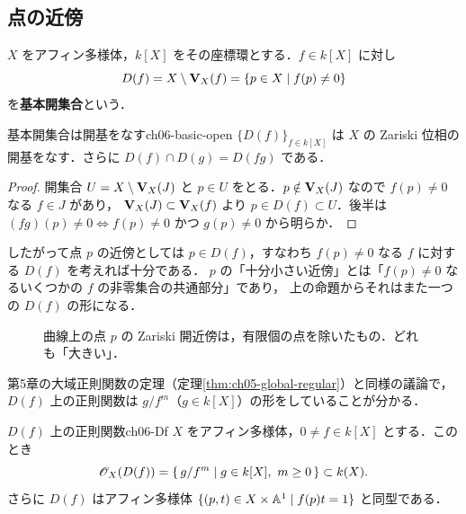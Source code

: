 \subsection{点の近傍}

$X$ をアフィン多様体，$k[X]$ をその座標環とする．$f\in k[X]$ に対し
\[
  D(f)=X\setminus\mathbf{V}_X(f)=\{p\in X\mid f(p)\neq0\}
\]
を\textbf{基本開集合}という．

\begin{myprop}{基本開集合は開基をなす}{ch06-basic-open}
$\{D(f)\}_{f\in k[X]}$ は $X$ の Zariski 位相の開基をなす．さらに $D(f)\cap D(g)=D(fg)$ である．
\end{myprop}

\begin{proof}
開集合 $U=X\setminus \mathbf{V}_X(J)$ と $p\in U$ をとる．$p\notin\mathbf{V}_X(J)$ なので $f(p)\neq0$ なる $f\in J$ があり，
$\mathbf{V}_X(J)\subset\mathbf{V}_X(f)$ より $p\in D(f)\subset U$．後半は $(fg)(p)\ne0\iff f(p)\ne0$ かつ $g(p)\ne0$ から明らか．
\end{proof}

したがって点 $p$ の近傍としては $p\in D(f)$，すなわち $f(p)\ne0$ なる $f$ に対する $D(f)$ を考えれば十分である．
$p$ の「十分小さい近傍」とは「$f(p)\neq0$ なるいくつかの $f$ の非零集合の共通部分」であり，
上の命題からそれはまた一つの $D(f)$ の形になる．

\begin{figure}[H]
\centering
{}
\caption{曲線上の点 $p$ の Zariski 開近傍は，有限個の点を除いたもの．どれも「大きい」．}
\label{fig:ch06-nbhd}
\end{figure}

第5章の大域正則関数の定理（定理\ref{thm:ch05-global-regular}）と同様の議論で，$D(f)$ 上の正則関数は $g/f^m$（$g\in k[X]$）の形をしていることが分かる．

\begin{myprop}{$D(f)$ 上の正則関数}{ch06-Df}
$X$ をアフィン多様体，$0\neq f\in k[X]$ とする．このとき
\[
  \mathscr{O}_X(D(f))=\{\,g/f^m\mid g\in k[X],\ m\ge0\,\}\subset k(X).
\]
さらに $D(f)$ はアフィン多様体 $\{(p,t)\in X\times\mathbb{A}^1\mid f(p)t=1\}$ と同型である．
\end{myprop}


